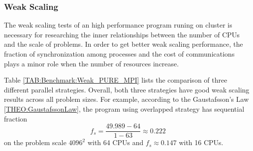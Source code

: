 
\subsubsection{Weak Scaling}
The weak scaling tests of an high performance program runing on cluster is necessary for researching the inner relationships 
between the number of CPUs and the scale of problems.
In order to get better weak scaling performance, the fraction of synchronization among processes and the cost of communications 
plays a minor role when the number of resources increase. 

Table \ref{TAB:Benchmark:Weak_PURE_MPI} lists the comparison of three different parallel strategies.
Overall, both three strategies have good weak scaling results across all problem sizes.
For example, according to the Gaustafsson's Law \ref{THEO:GaustafssonLaw}, the program using
overlapped strategy has sequential fraction 
$$f_s = \frac{49.989 - 64}{1-63} \approx 0.222$$
on the problem scale $4096^2$ with 64 CPUs
and $f_s \approx 0.147$ with 16 CPUs.

